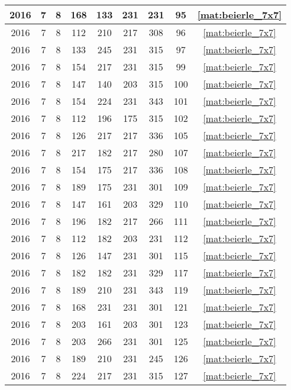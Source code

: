 \begin{longtable}{|c|c|c|c|c|c|c|c|c|}
2016 & 7 & 8 & 168 & 133 & 231 & 231 & 95 & \eqref{mat:beierle_7x7} \\ \hline 
2016 & 7 & 8 & 112 & 210 & 217 & 308 & 96 & \eqref{mat:beierle_7x7} \\ \hline 
2016 & 7 & 8 & 133 & 245 & 231 & 315 & 97 & \eqref{mat:beierle_7x7} \\ \hline 
2016 & 7 & 8 & 154 & 217 & 231 & 315 & 99 & \eqref{mat:beierle_7x7} \\ \hline 
2016 & 7 & 8 & 147 & 140 & 203 & 315 & 100 & \eqref{mat:beierle_7x7} \\ \hline 
2016 & 7 & 8 & 154 & 224 & 231 & 343 & 101 & \eqref{mat:beierle_7x7} \\ \hline 
2016 & 7 & 8 & 112 & 196 & 175 & 315 & 102 & \eqref{mat:beierle_7x7} \\ \hline 
2016 & 7 & 8 & 126 & 217 & 217 & 336 & 105 & \eqref{mat:beierle_7x7} \\ \hline 
2016 & 7 & 8 & 217 & 182 & 217 & 280 & 107 & \eqref{mat:beierle_7x7} \\ \hline 
2016 & 7 & 8 & 154 & 175 & 217 & 336 & 108 & \eqref{mat:beierle_7x7} \\ \hline 
2016 & 7 & 8 & 189 & 175 & 231 & 301 & 109 & \eqref{mat:beierle_7x7} \\ \hline 
2016 & 7 & 8 & 147 & 161 & 203 & 329 & 110 & \eqref{mat:beierle_7x7} \\ \hline 
2016 & 7 & 8 & 196 & 182 & 217 & 266 & 111 & \eqref{mat:beierle_7x7} \\ \hline 
2016 & 7 & 8 & 112 & 182 & 203 & 231 & 112 & \eqref{mat:beierle_7x7} \\ \hline 
2016 & 7 & 8 & 126 & 147 & 231 & 301 & 115 & \eqref{mat:beierle_7x7} \\ \hline 
2016 & 7 & 8 & 182 & 182 & 231 & 329 & 117 & \eqref{mat:beierle_7x7} \\ \hline 
2016 & 7 & 8 & 189 & 210 & 231 & 343 & 119 & \eqref{mat:beierle_7x7} \\ \hline 
2016 & 7 & 8 & 168 & 231 & 231 & 301 & 121 & \eqref{mat:beierle_7x7} \\ \hline 
2016 & 7 & 8 & 203 & 161 & 203 & 301 & 123 & \eqref{mat:beierle_7x7} \\ \hline 
2016 & 7 & 8 & 203 & 266 & 231 & 301 & 125 & \eqref{mat:beierle_7x7} \\ \hline 
2016 & 7 & 8 & 189 & 210 & 231 & 245 & 126 & \eqref{mat:beierle_7x7} \\ \hline 
2016 & 7 & 8 & 224 & 217 & 231 & 315 & 127 & \eqref{mat:beierle_7x7} \\ \hline 

\end{longtable}
